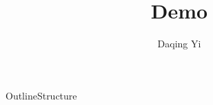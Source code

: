 \documentclass{beamer}
\title{Demo}
\author{Daqing Yi 
}
\institute
{
  Department of Computer Science\\
  Brigham Young University
}
\date[]{}
\begin{document}
\begin{frame}
  \titlepage
\end{frame}

\begin{frame}{Outline}{Structure}
  \tableofcontents
\end{frame}













\end{document}
